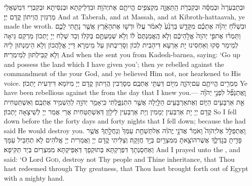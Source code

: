 {וּבְתַבְעֵרָה֙ וּבְמַסָּ֔ה וּבְקִבְרֹ֖ת הַֽתַּאֲוָ֑ה מַקְצִפִ֥ים הֱיִיתֶ֖ם אֶת\maqqaf יְהֹוָֽה׃}
{וּבִדְלֵיקְתָא וּבְנִסֵּיתָא וּבְקִבְרֵי דִּמְשַׁאֲלֵי מַרְגְּזִין הֲוֵיתוֹן קֳדָם יְיָ׃}
{And at Taberah, and at Massah, and at Kibroth-hattaavah, ye made the \lord\space wroth.}{}
{וּבִשְׁלֹ֨חַ יְהֹוָ֜ה אֶתְכֶ֗ם מִקָּדֵ֤שׁ בַּרְנֵ֙עַ֙ לֵאמֹ֔ר עֲלוּ֙ וּרְשׁ֣וּ אֶת\maqqaf הָאָ֔רֶץ אֲשֶׁ֥ר נָתַ֖תִּי לָכֶ֑ם וַתַּמְר֗וּ אֶת\maqqaf פִּ֤י יְהֹוָה֙ אֱלֹ֣הֵיכֶ֔ם וְלֹ֤א הֶֽאֱמַנְתֶּם֙ ל֔וֹ וְלֹ֥א שְׁמַעְתֶּ֖ם בְּקֹלֽוֹ׃}
{וְכַד שְׁלַח יְיָ יָתְכוֹן מֵרְקַם גֵּיאָה לְמֵימַר סַקוּ וְאַחְסִינוּ יָת אַרְעָא דִּיהַבִית לְכוֹן וְסָרֵיבְתּוּן עַל מֵימְרָא דַּייָ אֱלָהֲכוֹן וְלָא הֵימַנְתּוּן לֵיהּ וְלָא קַבֵּילְתּוּן לְמֵימְרֵיהּ׃}
{And when the \lord\space sent you from Kadesh-barnea, saying: ‘Go up and possess the land which I have given you’; then ye rebelled against the commandment of the \lord\space your God, and ye believed Him not, nor hearkened to His voice.}{}
{מַמְרִ֥ים הֱיִיתֶ֖ם עִם\maqqaf יְהֹוָ֑ה מִיּ֖וֹם דַּעְתִּ֥י אֶתְכֶֽם׃}
{מְסָרְבִין הֲוֵיתוּן קֳדָם יְיָ מִיּוֹמָא דִּידַעִית יָתְכוֹן׃}
{Ye have been rebellious against the \lord\space from the day that I knew you.—}{}
{וָֽאֶתְנַפַּ֞ל לִפְנֵ֣י יְהֹוָ֗ה אֵ֣ת אַרְבָּעִ֥ים הַיּ֛וֹם וְאֶת\maqqaf אַרְבָּעִ֥ים הַלַּ֖יְלָה אֲשֶׁ֣ר הִתְנַפָּ֑לְתִּי כִּֽי\maqqaf אָמַ֥ר יְהֹוָ֖ה לְהַשְׁמִ֥יד אֶתְכֶֽם׃}
{וְאִשְׁתַּטַּחִית קֳדָם יְיָ יָת אַרְבְּעִין יְמָמִין וְיָת אַרְבְּעִין לֵילָוָן דְּאִשְׁתַּטַּחִית אֲרֵי אֲמַר יְיָ לְשֵׁיצָאָה יָתְכוֹן׃}
{So I fell down before the \lord\space the forty days and forty nights that I fell down; because the \lord\space had said He would destroy you.}{}
{וָאֶתְפַּלֵּ֣ל אֶל\maqqaf יְהֹוָה֮ וָאֹמַר֒ אֲדֹנָ֣י יֱהֹוִ֗ה אַל\maqqaf תַּשְׁחֵ֤ת עַמְּךָ֙ וְנַחֲלָ֣תְךָ֔ אֲשֶׁ֥ר פָּדִ֖יתָ בְּגׇדְלֶ֑ךָ אֲשֶׁר\maqqaf הוֹצֵ֥אתָ מִמִּצְרַ֖יִם בְּיָ֥ד חֲזָקָֽה׃}
{וְצַלִּיתִי קֳדָם יְיָ וַאֲמַרִית יְיָ אֱלֹהִים לָא תְחַבֵּיל עַמָּךְ וְאַחְסָנְתָךְ דִּפְרַקְתָּא בְּתוּקְפָךְ דְּאַפֵּיקְתָּא מִמִּצְרַיִם בְּיַד תַּקִּיפָא׃}
{And I prayed unto the \lord, and said: ‘O Lord \textsc{God}, destroy not Thy people and Thine inheritance, that Thou hast redeemed through Thy greatness, that Thou hast brought forth out of Egypt with a mighty hand.}{}

